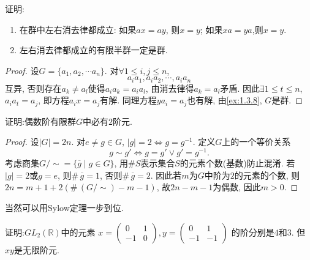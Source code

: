 \begin{problem}\label{ex:1.3.9}
    证明:
    \begin{enumerate}[(1)]
        \item 在群中左右消去律都成立: 如果$ax = ay$, 则$x = y$; 如果$xa = ya$,则$x = y$.
        \item 左右消去律都成立的有限半群一定是群.
    \end{enumerate}
\end{problem}

\begin{proof}
    设$G = \{a_1, a_2, \cdots a_n\}$. 对$\forall 1 \leqslant i, j \leqslant n$,
    \[
        a_ia_1, a_ia_2, \cdots, a_ia_n
    \]
    互异, 否则存在$a_k \neq a_l$使得$a_ia_k = a_ia_l$, 由消去律得$a_k = a_l$矛盾. 因此$\exists 1 \leqslant t \leqslant n$, $a_ia_t = a_j$, 即方程$a_ix = a_j$有解. 同理方程$ya_i = a_j$也有解, 由\ref{ex:1.3.8}, $G$是群.
\end{proof}

\begin{problem}\label{ex:1.3.10}
    证明:偶数阶有限群$G$中必有$2$阶元.
\end{problem}

\begin{proof}
    设$|G| = 2n$. 对$e \neq g \in G$, $|g| = 2 \iff g = g^{-1}$. 定义$G$上的一个等价关系
    \[
        g \sim g' \iff g = g' \lor g' = g^{-1}.
    \]
    考虑商集$G/\sim = \{\overline{g} \mid g \in G\}$, 用$\#S$表示集合$S$的元素个数(基数)防止混淆. 若$|g| = 2$或$g = e$, 则$\#\, \overline{g} = 1$, 否则$\#\, \overline{g} = 2$. 因此若$m$为$G$中阶为$2$的元素的个数, 则$2n = m + 1 + 2(\#\, (G/\sim) - m - 1)$, 故$2n - m - 1$为偶数, 因此$m > 0$.
\end{proof}

\begin{remark}
    当然可以用Sylow定理一步到位.
\end{remark}

\begin{problem}
    证明:$GL_2(\mathbb{R})$中的元素
    \(
        x = \begin{pmatrix}
            0 & 1\\
            -1 & 0
        \end{pmatrix},
        y = \begin{pmatrix}
            0 & 1\\
            -1 & -1
        \end{pmatrix}
    \)
    的阶分别是$4$和$3$. 但$xy$是无限阶元.
\end{problem}

